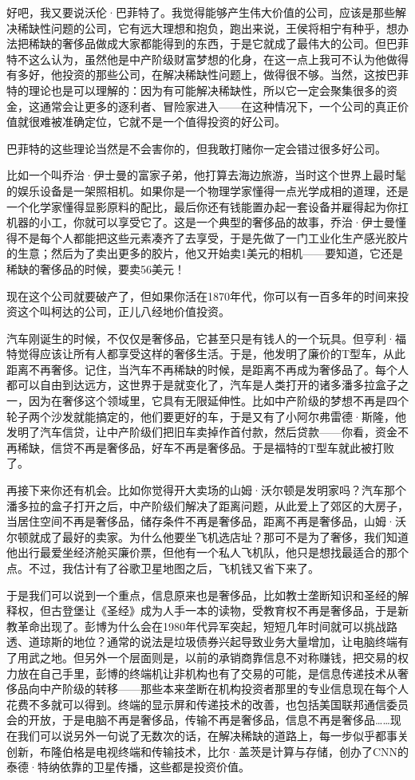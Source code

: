 好吧，我又要说沃伦·巴菲特了。我觉得能够产生伟大价值的公司，应该是那些解决稀缺性问题的公司，它有远大理想和抱负，跑出来说，王侯将相宁有种乎，想办法把稀缺的奢侈品做成大家都能得到的东西，于是它就成了最伟大的公司。但巴菲特不这么认为，虽然他是中产阶级财富梦想的化身，在这一点上我可不认为他做得有多好，他投资的那些公司，在解决稀缺性问题上，做得很不够。当然，这按巴菲特的理论也是可以理解的：因为有可能解决稀缺性，所以它一定会聚集很多的资金，这通常会让更多的逐利者、冒险家进入------在这种情况下，一个公司的真正价值就很难被准确定位，它就不是一个值得投资的好公司。

巴菲特的这些理论当然是不会害你的，但我敢打赌你一定会错过很多好公司。

比如一个叫乔治·伊士曼的富家子弟，他打算去海边旅游，当时这个世界上最时髦的娱乐设备是一架照相机。如果你是一个物理学家懂得一点光学成相的道理，还是一个化学家懂得显影原料的配比，最后你还有钱能置办起一套设备并雇得起为你扛机器的小工，你就可以享受它了。这是一个典型的奢侈品的故事，乔治·伊士曼懂得不是每个人都能把这些元素凑齐了去享受，于是先做了一门工业化生产感光胶片的生意；然后为了卖出更多的胶片，他又开始卖1美元的相机------要知道，它还是稀缺的奢侈品的时候，要卖56美元！

现在这个公司就要破产了，但如果你活在1870年代，你可以有一百多年的时间来投资这个叫柯达的公司，正儿八经地价值投资。

汽车刚诞生的时候，不仅仅是奢侈品，它甚至只是有钱人的一个玩具。但亨利·福特觉得应该让所有人都享受这样的奢侈生活。于是，他发明了廉价的T型车，从此距离不再奢侈。记住，当汽车不再稀缺的时候，是距离不再成为奢侈品了。每个人都可以自由到达远方，这世界于是就变化了，汽车是人类打开的诸多潘多拉盒子之一，因为在奢侈这个领域里，它具有无限延伸性。比如中产阶级的梦想不再是四个轮子两个沙发就能搞定的，他们要更好的车，于是又有了小阿尔弗雷德·斯隆，他发明了汽车信贷，让中产阶级们把旧车卖掉作首付款，然后贷款------你看，资金不再稀缺，信贷不再是奢侈品，好车不再是奢侈品。于是福特的T型车就此被打败了。

再接下来你还有机会。比如你觉得开大卖场的山姆·沃尔顿是发明家吗？汽车那个潘多拉的盒子打开之后，中产阶级们解决了距离问题，从此爱上了郊区的大房子，当居住空间不再是奢侈品，储存条件不再是奢侈品，距离不再是奢侈品，山姆·沃尔顿就成了最好的卖家。为什么他要坐飞机选店址？那可不是为了奢侈，我们知道他出行最爱坐经济舱买廉价票，但他有一个私人飞机队，他只是想找最适合的那个点。不过，我估计有了谷歌卫星地图之后，飞机钱又省下来了。

于是我们可以说到一个重点，信息原来也是奢侈品，比如教士垄断知识和圣经的解释权，但古登堡让《圣经》成为人手一本的读物，受教育权不再是奢侈品，于是新教革命出现了。彭博为什么会在1980年代异军突起，短短几年时间就可以挑战路透、道琼斯的地位？通常的说法是垃圾债券兴起导致业务大量增加，让电脑终端有了用武之地。但另外一个层面则是，以前的承销商靠信息不对称赚钱，把交易的权力放在自己手里，彭博的终端机让非机构也有了交易的可能，是信息传递技术从奢侈品向中产阶级的转移------那些本来垄断在机构投资者那里的专业信息现在每个人花费不多就可以得到。终端的显示屏和传递技术的改善，也包括美国联邦通信委员会的开放，于是电脑不再是奢侈品，传输不再是奢侈品，信息不再是奢侈品\ldots\ldots 现在我们可以说另外一句说了无数次的话，在解决稀缺的道路上，每一步似乎都事关创新，布隆伯格是电视终端和传输技术，比尔·盖茨是计算与存储，创办了CNN的泰德·特纳依靠的卫星传播，这些都是投资价值。

